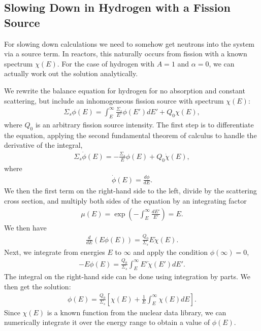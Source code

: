 \subsection{Slowing Down in Hydrogen with a Fission Source}

For slowing down calculations we need to somehow get neutrons into the system via a source term. In reactors, this naturally occurs from fission with a known spectrum $\chi(E)$. For the case of hydrogen with $A = 1$ and $\alpha = 0$, we can actually work out the solution analytically.

We rewrite the balance equation for hydrogen for no absorption and constant scattering, but include an inhomogeneous fission source with spectrum $\chi(E)$:
\begin{align}
  \Sigma_s \phi(E) = \int_E^\infty \frac{\Sigma_s}{E'} \phi(E') dE' + Q_0 \chi(E) ,
\end{align}
where $Q_0$ is an arbitrary fission source intensity. The first step is to differentiate the equation, applying the second fundamental theorem of calculus to handle the derivative of the integral,
\begin{align}
  \Sigma_s \dot{\phi}(E) = -\frac{\Sigma_s}{E} \phi(E) + Q_0 \dot{\chi}(E) ,
\end{align}
where
\begin{align}
  \dot{\phi}(E) = \frac{d\phi}{dE} .
\end{align}
We then the first term on the right-hand side to the left, divide by the scattering cross section, and multiply both sides of the equation by an integrating factor
\begin{align}
  \mu(E) = \exp\left( -\int_E^\infty \frac{dE'}{E'} \right) = E .
\end{align} 
We then have
\begin{align}
  \frac{d}{dE} \left( E \phi(E) \right) = \frac{Q_0}{\Sigma_s} E \dot{\chi}(E) .
\end{align}
Next, we integrate from energies $E$ to $\infty$ and apply the condition $\phi(\infty) = 0$,
\begin{align}
  - E \phi(E) = \frac{Q_0}{\Sigma_s} \int_E^\infty E' \dot{\chi}(E') dE' .
\end{align}
The integral on the right-hand side can be done using integration by parts. We then get the solution:
\begin{align}
  \phi(E) = \frac{ Q_0 }{ \Sigma_s} \left[ \chi(E) + \frac{1}{E} \int_E^\infty \chi(E) dE \right] .
\end{align}
Since $\chi(E)$ is a known function from the nuclear data library, we can numerically integrate it over the energy range to obtain a value of $\phi(E)$.

